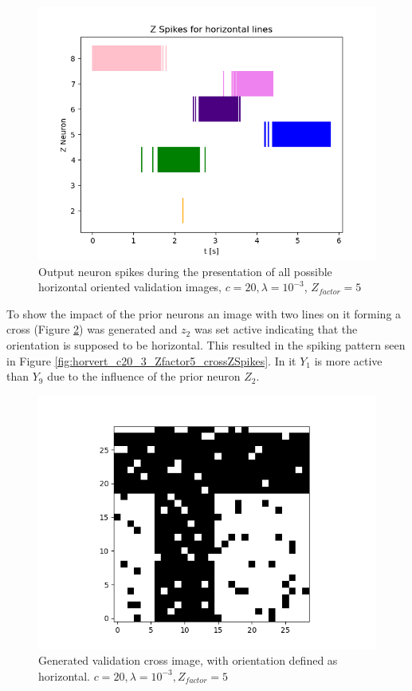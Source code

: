 \begin{figure}
  \includegraphics[width=\linewidth]{figures/horvert/horvert_c20_3_Zfactor5_horizontalZSpikes.png}
  \caption{Output neuron spikes during the presentation of all possible horizontal oriented validation images, $c = 20, \lambda = 10^{-3}$, $Z_{factor} = 5$}
  \label{fig:horvert_c20_3_Zfactor5_horizontalZSpikes}
\end{figure}


To show the impact of the prior neurons an image with two lines on it forming a cross (Figure \ref{fig:horvertValidationCross}) was generated and $z_2$ was set active indicating that the orientation is supposed to be horizontal. This resulted in the spiking pattern seen in Figure \ref{fig:horvert_c20_3_Zfactor5_crossZSpikes}. In it $Y_1$ is more active than $Y_9$ due to the influence of the prior neuron $Z_2$.

\begin{figure}
  \includegraphics[width=\linewidth]{figures/horvert/horvert_c20_3_Zfactor5_validationCross.png}
  \caption{Generated validation cross image, with orientation defined as horizontal. $c = 20, \lambda = 10^{-3}, Z_{factor} = 5$}
  \label{fig:horvertValidationCross}
\end{figure}

